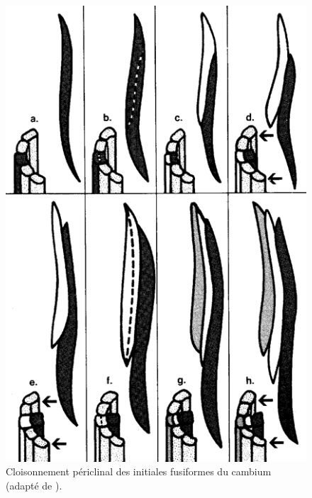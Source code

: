 \begin{figure}[h]
	\centering
	\includegraphics[scale=0.5]{img/ch5_periclinal}
	\caption{Cloisonnement périclinal des initiales fusiformes du cambium (adapté de \cite{bowyer2007forest}).}
	\label{fig:periclinal}
\end{figure}

